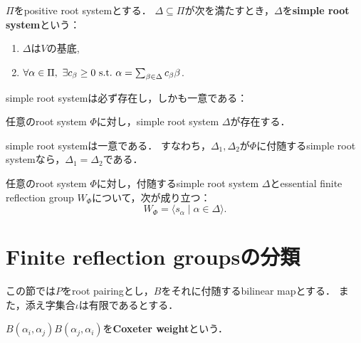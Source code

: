 \begin{definition}
  \label{defi:SimpleRootSystem}
  \leanok
  $\Pi$をpositive root systemとする．
  $\Delta \subseteq \Pi$が次を満たすとき，$\Delta$を\textbf{simple root system}という：
  \begin{enumerate}[label=(\roman*)]
    \item $\Delta$は$V$の基底,
    \item $\forall \alpha \in \Pi,\ \exists c_\beta \ge 0 \ \text{s.t.}\  \alpha = \sum_{\beta \in \Delta} c_\beta \beta$.
  \end{enumerate}
\end{definition}

simple root systemは必ず存在し，しかも一意である：

\begin{theorem}
  \label{thm:RootPairing.exists_SimpleRootSystem}
  任意のroot system $\Phi$に対し，simple root system $\Delta$が存在する．
\end{theorem}

\begin{theorem}
  \label{thm:RootPairing.unique_SimpleRootSystem}
  simple root systemは一意である．
  すなわち，$\Delta_1, \Delta_2$が$\Phi$に付随するsimple root systemなら，$\Delta_1 = \Delta_2$である．
\end{theorem}

\begin{theorem}
  \label{thm:RootPairing.FRG_gen_by_SimpleRootSystem}
  任意のroot system $\Phi$に対し，付随するsimple root system $\Delta$とessential finite reflection group $W_\Phi$について，次が成り立つ：
  \begin{equation}
    W_\Phi = \langle s_\alpha \mid \alpha \in \Delta \rangle.
  \end{equation}
\end{theorem}

\section{Finite reflection groupsの分類}
この節では$P$をroot pairingとし，$B$をそれに付随するbilinear mapとする．
また，添え字集合$\iota$は有限であるとする．
\begin{definition}
  \label{defi:RootPairing.coxeterWeightIn}
  \leanok
  $B(\alpha_i, \alpha_j) B(\alpha_j, \alpha_i)$を\textbf{Coxeter weight}という．
\end{definition}

